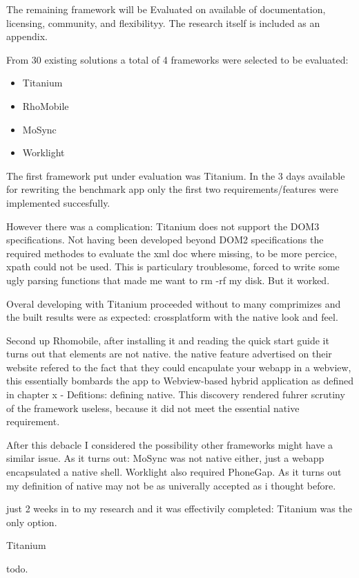 The remaining framework will be Evaluated on available of documentation, licensing, community, and flexibilityy. The research itself is included as an appendix.


From 30 existing solutions a total of 4 frameworks were selected to be evaluated:
\begin{itemize}
	\item Titanium
	\item RhoMobile
	\item MoSync
	\item Worklight
\end{itemize}

The first framework put under evaluation was Titanium. In the 3 days available for rewriting the benchmark app only the first two requirements/features were implemented succesfully.

However there was a complication: Titanium does not support the DOM3 specifications. Not having been developed beyond DOM2 specifications the required methodes to evaluate the xml doc where missing, to be more percice, xpath could not be used. This is particulary troublesome, forced to write some ugly parsing functions that made me want to rm -rf my disk. But it worked.

Overal developing with Titanium proceeded without to many comprimizes and the built results were as expected: crossplatform with the native look and feel.


Second up Rhomobile, after installing it and reading the quick start guide it turns out that elements are not native. the native feature advertised on their website refered to the fact that they could encapulate your webapp in a webview, this essentially bombards the app to Webview-based hybrid application as defined in chapter x - Defitions: defining native. This discovery rendered fuhrer scrutiny of the framework useless, because it did not meet the essential native requirement.

After this debacle I considered the possibility other frameworks might have a similar issue. As it turns out: MoSync was not native either, just a webapp encapsulated a native shell. Worklight also required PhoneGap. As it turns out my definition of native may not be as univerally accepted as i thought before.

just 2 weeks in to my research and it was effectivily completed: Titanium was the only option.


Titanium 



todo.